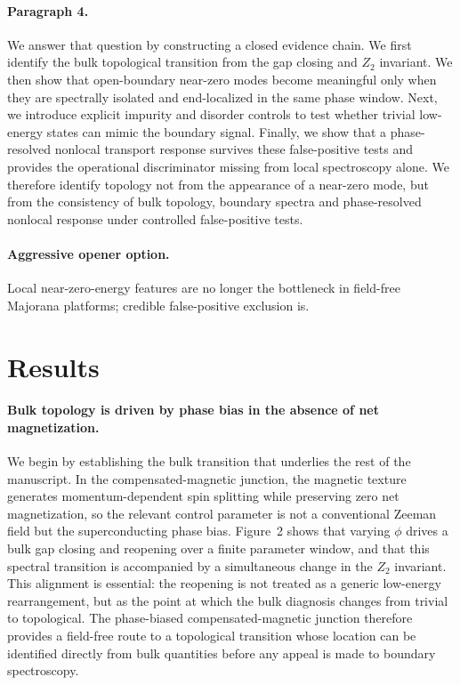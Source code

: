 \paragraph{Paragraph 4.}
We answer that question by constructing a closed evidence chain. We first identify the bulk topological transition from the gap closing and $Z_2$ invariant. We then show that open-boundary near-zero modes become meaningful only when they are spectrally isolated and end-localized in the same phase window. Next, we introduce explicit impurity and disorder controls to test whether trivial low-energy states can mimic the boundary signal. Finally, we show that a phase-resolved nonlocal transport response survives these false-positive tests and provides the operational discriminator missing from local spectroscopy alone. We therefore identify topology not from the appearance of a near-zero mode, but from the consistency of bulk topology, boundary spectra and phase-resolved nonlocal response under controlled false-positive tests.

\paragraph{Aggressive opener option.}
Local near-zero-energy features are no longer the bottleneck in field-free Majorana platforms; credible false-positive exclusion is.

\section*{Results}

\paragraph{Bulk topology is driven by phase bias in the absence of net magnetization.}
We begin by establishing the bulk transition that underlies the rest of the manuscript. In the compensated-magnetic junction, the magnetic texture generates momentum-dependent spin splitting while preserving zero net magnetization, so the relevant control parameter is not a conventional Zeeman field but the superconducting phase bias. Figure~2 shows that varying $\phi$ drives a bulk gap closing and reopening over a finite parameter window, and that this spectral transition is accompanied by a simultaneous change in the $Z_2$ invariant. This alignment is essential: the reopening is not treated as a generic low-energy rearrangement, but as the point at which the bulk diagnosis changes from trivial to topological. The phase-biased compensated-magnetic junction therefore provides a field-free route to a topological transition whose location can be identified directly from bulk quantities before any appeal is made to boundary spectroscopy.

